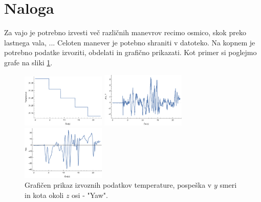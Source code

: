\newpage
\section{Naloga}
Za vajo je potrebno izvesti več različnih manevrov recimo osmico, skok preko lastnega vala, ... Celoten manever je potebno shraniti v datoteko. Na kopnem je potrebno podatke izvoziti, obdelati in grafično prikazati. Kot primer si poglejmo grafe na sliki \ref{fig:v_mems_graf}. 

\begin{figure}[!htbp]
	\begin{minipage}{3.5cm}
		\centering \includegraphics[width=4cm]{Vaje/ManevrZMems/figs/temp.pdf}
	\end{minipage}
	\hfill
	\begin{minipage}{3.5cm}
		\centering \includegraphics[width=4cm]{Vaje/ManevrZMems/figs/acc_y.pdf}
	\end{minipage}
	\hfill
	\begin{minipage}{3.5cm}
		\centering \includegraphics[width=4cm]{Vaje/ManevrZMems/figs/yaw.pdf}
	\end{minipage}
	\caption{Grafičen prikaz izvoznih podatkov temperature, pospeška v $y$ smeri in kota okoli $z$ osi - "Yaw".}
	\label{fig:v_mems_graf}
\end{figure}

